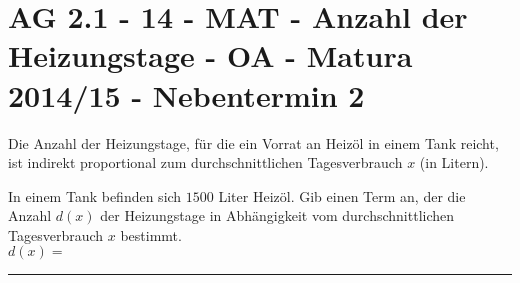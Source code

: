 \section{AG 2.1 - 14 - MAT - Anzahl der Heizungstage - OA - Matura 2014/15 - Nebentermin 2}

\begin{beispiel}[AG 2.1]{1} %
				Die Anzahl der Heizungstage, für die ein Vorrat an Heizöl in einem Tank reicht, ist indirekt proportional zum durchschnittlichen Tagesverbrauch $x$ (in Litern).
				
				In einem Tank befinden sich $1500$ Liter Heizöl. Gib einen Term an, der die Anzahl $d(x)$ der Heizungstage in Abhängigkeit vom durchschnittlichen Tagesverbrauch $x$ bestimmt.\\
				
				$d(x)=$ \rule{5cm}{0.3pt}\\
				
\end{beispiel}